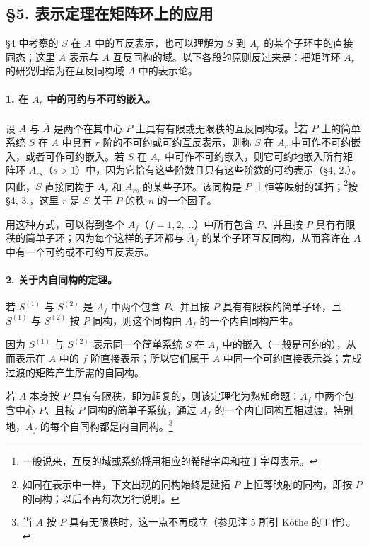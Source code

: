 \subsection*{§5. 表示定理在矩阵环上的应用}

§4 中考察的 \(S\) 在 \(A\) 中的互反表示，也可以理解为 \(S\) 到 \(A_r\) 的某个子环中的直接同态；这里 \(\overline A\) 表示与 \(A\) 互反同构的域。以下各段的原则反过来是：把矩阵环 \(A_r\) 的研究归结为在互反同构域 \(A\) 中的表示论。

\paragraph{1. 在 \(A_r\) 中的可约与不可约嵌入。}
设 \(A\) 与 \(\overline A\) 是两个在其中心 \(P\) 上具有有限或无限秩的互反同构域。\footnote{一般说来，互反的域或系统将用相应的希腊字母和拉丁字母表示。}若 \(P\) 上的简单系统 \(S\) 在 \(A\) 中具有 \(r\) 阶的不可约或可约互反表示，则称 \(S\) 在 \(A_r\) 中可作不可约嵌入，或者可作可约嵌入。若 \(S\) 在 \(A_r\) 中可作不可约嵌入，则它可约地嵌入所有矩阵环 \(A_{rs}\)（\(s>1\)）中，因为它恰有这些阶数且只有这些阶数的可约表示（§4, 2.）。因此，\(S\) 直接同构于 \(A_r\) 和 \(A_{rs}\) 的某些子环。该同构是 \(P\) 上恒等映射的延拓；\footnote{如同在表示中一样，下文出现的同构始终是延拓 \(P\) 上恒等映射的同构，即按 \(P\) 的同构；以后不再每次另行说明。}按 §4, 3.，这里 \(r\) 是 \(S\) 关于 \(P\) 的秩 \(n\) 的一个因子。

用这种方式，可以得到各个 \(A_f\)（\(f=1,2,\ldots\)）中所有包含 \(P\)、并且按 \(P\) 具有有限秩的简单子环；因为每个这样的子环都与 \(\overline A_f\) 的某个子环互反同构，从而容许在 \(A\) 中有一个可约或不可约互反表示。

\paragraph{2. 关于内自同构的定理。}
若 \(S^{(1)}\) 与 \(S^{(2)}\) 是 \(A_f\) 中两个包含 \(P\)、并且按 \(P\) 具有有限秩的简单子环，且 \(S^{(1)}\) 与 \(S^{(2)}\) 按 \(P\) 同构，则这个同构由 \(A_f\) 的一个内自同构产生。

因为 \(S^{(1)}\) 与 \(S^{(2)}\) 表示同一个简单系统 \(S\) 在 \(A_f\) 中的嵌入（一般是可约的），从而表示在 \(A\) 中的 \(f\) 阶直接表示；所以它们属于 \(A\) 中同一个可约直接表示类；完成过渡的矩阵产生所需的自同构。

若 \(A\) 本身按 \(P\) 具有有限秩，即为超复的，则该定理化为熟知命题：\(A_f\) 中两个包含中心 \(P\)、且按 \(P\) 同构的简单子系统，通过 \(A_f\) 的一个内自同构互相过渡。特别地，\(A_f\) 的每个自同构都是内自同构。\footnote{当 \(A\) 按 \(P\) 具有无限秩时，这一点不再成立（参见注 5 所引 Köthe 的工作）。}

